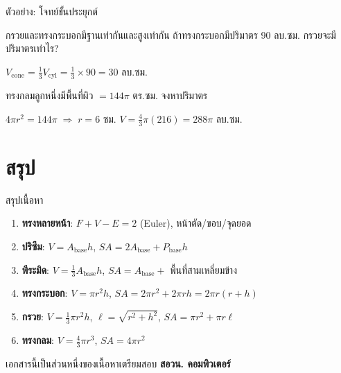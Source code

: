 \documentclass[11pt, aspectratio=169]{beamer}
\begin{document}
\begin{frame}{ตัวอย่าง: โจทย์ขั้นประยุกต์}
  \begin{exambox}[โจทย์ 3]
    กรวยและทรงกระบอกมีฐานเท่ากันและสูงเท่ากัน
    ถ้าทรงกระบอกมีปริมาตร 90 ลบ.ซม. กรวยจะมีปริมาตรเท่าไร?
  \end{exambox}

  \begin{solbox}[วิธีทำ]
    $V_{\text{cone}} = \frac{1}{3}V_{\text{cyl}} = \frac{1}{3} \times 90 = 30$ ลบ.ซม.
  \end{solbox}

  \begin{exambox}[โจทย์ 4]
    ทรงกลมลูกหนึ่งมีพื้นที่ผิว $= 144\pi$ ตร.ซม. จงหาปริมาตร
  \end{exambox}

  \begin{solbox}[วิธีทำ]
    $4\pi r^2 = 144\pi \;\Rightarrow\; r = 6$ ซม. \quad
    $V = \frac{4}{3}\pi (216) = 288\pi$ ลบ.ซม.
  \end{solbox}
\end{frame}

\section{สรุป}

\begin{frame}{สรุปเนื้อหา}
  \begin{explanation}[สิ่งที่ได้เรียนรู้]
    \begin{enumerate}
      \item \textbf{ทรงหลายหน้า}: $F + V - E = 2$ (Euler), หน้าตัด/ขอบ/จุดยอด
      \item \textbf{ปริซึม}: $V = A_{\text{base}}h$,
             $SA = 2A_{\text{base}} + P_{\text{base}}h$
      \item \textbf{พีระมิด}: $V = \frac{1}{3}A_{\text{base}}h$,
             $SA = A_{\text{base}} +$ พื้นที่สามเหลี่ยมข้าง
      \item \textbf{ทรงกระบอก}: $V = \pi r^2 h$,
             $SA = 2\pi r^2 + 2\pi rh = 2\pi r(r+h)$
      \item \textbf{กรวย}: $V = \frac{1}{3}\pi r^2 h$, $\ell = \sqrt{r^2 + h^2}$,
             $SA = \pi r^2 + \pi r\ell$
      \item \textbf{ทรงกลม}: $V = \frac{4}{3}\pi r^3$,
             $SA = 4\pi r^2$
    \end{enumerate}
  \end{explanation}
  \begin{center}
    \large เอกสารนี้เป็นส่วนหนึ่งของเนื้อหาเตรียมสอบ \textbf{สอวน. คอมพิวเตอร์}
  \end{center}
\end{frame}
\end{document}
